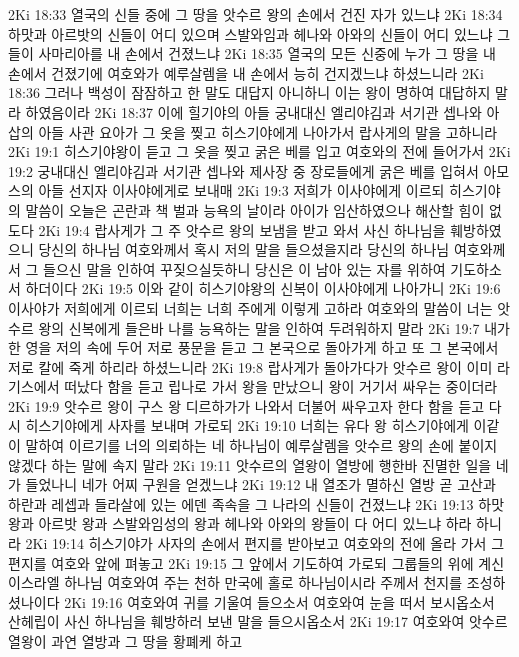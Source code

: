2Ki 18:33  열국의 신들 중에 그 땅을 앗수르 왕의 손에서 건진 자가 있느냐
2Ki 18:34  하맛과 아르밧의 신들이 어디 있으며 스발와임과 헤나와 아와의 신들이 어디 있느냐 그들이 사마리아를 내 손에서 건졌느냐
2Ki 18:35  열국의 모든 신중에 누가 그 땅을 내 손에서 건졌기에 여호와가 예루살렘을 내 손에서 능히 건지겠느냐 하셨느니라
2Ki 18:36  그러나 백성이 잠잠하고 한 말도 대답지 아니하니 이는 왕이 명하여 대답하지 말라 하였음이라
2Ki 18:37  이에 힐기야의 아들 궁내대신 엘리야김과 서기관 셉나와 아삽의 아들 사관 요아가 그 옷을 찢고 히스기야에게 나아가서 랍사게의 말을 고하니라
2Ki 19:1  히스기야왕이 듣고 그 옷을 찢고 굵은 베를 입고 여호와의 전에 들어가서
2Ki 19:2  궁내대신 엘리야김과 서기관 셉나와 제사장 중 장로들에게 굵은 베를 입혀서 아모스의 아들 선지자 이사야에게로 보내매
2Ki 19:3  저희가 이사야에게 이르되 히스기야의 말씀이 오늘은 곤란과 책 벌과 능욕의 날이라 아이가 임산하였으나 해산할 힘이 없도다
2Ki 19:4  랍사게가 그 주 앗수르 왕의 보냄을 받고 와서 사신 하나님을 훼방하였으니 당신의 하나님 여호와께서 혹시 저의 말을 들으셨을지라 당신의 하나님 여호와께서 그 들으신 말을 인하여 꾸짖으실듯하니 당신은 이 남아 있는 자를 위하여 기도하소서 하더이다
2Ki 19:5  이와 같이 히스기야왕의 신복이 이사야에게 나아가니
2Ki 19:6  이사야가 저희에게 이르되 너희는 너희 주에게 이렇게 고하라 여호와의 말씀이 너는 앗수르 왕의 신복에게 들은바 나를 능욕하는 말을 인하여 두려워하지 말라
2Ki 19:7  내가 한 영을 저의 속에 두어 저로 풍문을 듣고 그 본국으로 돌아가게 하고 또 그 본국에서 저로 칼에 죽게 하리라 하셨느니라
2Ki 19:8  랍사게가 돌아가다가 앗수르 왕이 이미 라기스에서 떠났다 함을 듣고 립나로 가서 왕을 만났으니 왕이 거기서 싸우는 중이더라
2Ki 19:9  앗수르 왕이 구스 왕 디르하가가 나와서 더불어 싸우고자 한다 함을 듣고 다시 히스기야에게 사자를 보내며 가로되
2Ki 19:10  너희는 유다 왕 히스기야에게 이같이 말하여 이르기를 너의 의뢰하는 네 하나님이 예루살렘을 앗수르 왕의 손에 붙이지 않겠다 하는 말에 속지 말라
2Ki 19:11  앗수르의 열왕이 열방에 행한바 진멸한 일을 네가 들었나니 네가 어찌 구원을 얻겠느냐
2Ki 19:12  내 열조가 멸하신 열방 곧 고산과 하란과 레셉과 들라살에 있는 에덴 족속을 그 나라의 신들이 건졌느냐
2Ki 19:13  하맛 왕과 아르밧 왕과 스발와임성의 왕과 헤나와 아와의 왕들이 다 어디 있느냐 하라 하니라
2Ki 19:14  히스기야가 사자의 손에서 편지를 받아보고 여호와의 전에 올라 가서 그 편지를 여호와 앞에 펴놓고
2Ki 19:15  그 앞에서 기도하여 가로되 그룹들의 위에 계신 이스라엘 하나님 여호와여 주는 천하 만국에 홀로 하나님이시라 주께서 천지를 조성하셨나이다
2Ki 19:16  여호와여 귀를 기울여 들으소서 여호와여 눈을 떠서 보시옵소서 산헤립이 사신 하나님을 훼방하러 보낸 말을 들으시옵소서
2Ki 19:17  여호와여 앗수르 열왕이 과연 열방과 그 땅을 황폐케 하고
